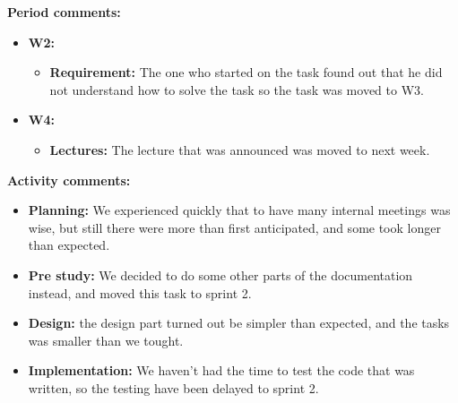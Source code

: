\textbf{Period comments:}
\begin{itemize}
\item{}\textbf{W2:} 
\begin{itemize}
\item{}\textbf{Requirement:} The one who started on the task found out that he did not understand how to solve the task so the task was moved to W3. 
\end{itemize}
\item{}\textbf{W4:}
\begin{itemize}
\item{} \textbf{Lectures:} The lecture that was announced was moved to next week. 
\end{itemize}
\end{itemize}

\newpage

\textbf{Activity comments:}
\begin{itemize}
\item{}\textbf{Planning:} We experienced quickly that to have many internal meetings was wise, but still there were more than first anticipated, and some took longer than expected. 
\item{}\textbf{Pre study:} We decided to do some other parts of the documentation instead, and moved this task to sprint 2. \item{}\textbf{Design:} the design part turned out be simpler than expected, and the tasks was smaller than we tought. \item{}\textbf{Implementation:} We haven't had the time to test the code that was written, so the testing have been delayed to sprint 2.
\end{itemize}